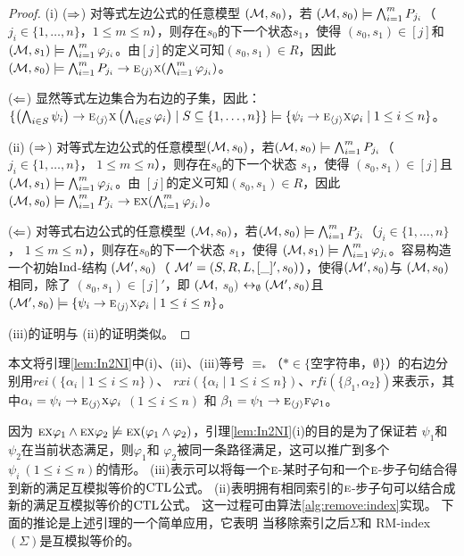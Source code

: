 \begin{proof}
	(i) ($\Rightarrow$) 对等式左边公式的任意模型 $({\cal M},s_0)$，若 $({\cal M},s_0) \models \bigwedge_{i=1}^m P_{j_i}$（ $j_i \in \{1, \dots, n\}$，$1\leq m \leq n$），则存在$s_0$的下一个状态$s_1$，使得 $(s_0, s_1) \in [j]$和 $({\cal M}, s_1) \models \bigwedge_{i=1}^m \varphi_{j_i}$。由$[j]$的定义可知$(s_0, s_1) \in R$，因此$({\cal M}, s_0) \models \bigwedge_{i=1}^m P_{j_i} \rightarrow \textsc{e}_{{\langle{j}\rangle}} \textsc{x} (\bigwedge_{i=1}^m \varphi_{j_i})$。 %
	
	($\Leftarrow$)  显然等式左边集合为右边的子集，因此：
	$\{\left(\bigwedge_{i\in S}\psi_i\right)\rightarrow \textsc{e}_{{\langle{j}\rangle}} \textsc{x} \left(\bigwedge_{i\in S}\varphi_i\right)\mid S\subseteq\{1,\dots, n\}\} \models \{\psi_i\rightarrow \textsc{e}_{{\langle{j}\rangle}} \textsc{x} \varphi_i \mid 1\le i\le n\}$。
	
	(ii) ($\Rightarrow$) 对等式左边公式的任意模型$({\cal M},s_0)$，若$({\cal M},s_0) \models \bigwedge_{i=1}^m P_{j_i}$（$j_i \in \{1, \dots, n\}$， $1\leq m \leq n$），则存在$s_0$的下一个状态 $s_1$，使得 $(s_0, s_1) \in [j]$且$({\cal M}, s_1) \models \bigwedge_{i=1}^m \varphi_{j_i}$。由 $[j]$的定义可知$(s_0, s_1) \in R$，因此$({\cal M}, s_0) \models \bigwedge_{i=1}^m P_{j_i} \rightarrow \textsc{e} \textsc{x} (\bigwedge_{i=1}^m \varphi_{j_i})$。 %
	
	($\Leftarrow$) 对等式右边公式的任意模型 $({\cal M},s_0)$，若$({\cal M},s_0) \models \bigwedge_{i=1}^m P_{j_i}$（$j_i \in \{1, \dots, n\}$， $1\leq m \leq n$），则存在$s_0$的下一个状态 $s_1$，使得 $({\cal M}, s_1) \models \bigwedge_{i=1}^m \varphi_{j_i}$。容易构造一个初始$\textrm{Ind}$-结构 $({\cal M}',s_0)$（ ${\cal M}'=(S,R,L,[\_]',s_0)$），使得$({\cal M}', s_0)$与 $({\cal M}, s_0)$相同，除了 $(s_0, s_1) \in [j]'$，即 $({\cal M},$ $s_0)$ $\leftrightarrow_{\emptyset} ({\cal M}', s_0)$且 $({\cal M}',s_0) \models \{\psi_i\rightarrow \textsc{e}_{{\langle{j}\rangle}} \textsc{x} \varphi_i \mid 1\le i\le n\}$。 
	
	(iii)的证明与 (ii)的证明类似。
\end{proof}


本文将引理\ref{lem:In2NI}中(i)、(ii)、(iii)等号 $\equiv_*$（$* \in \{$空字符串，$\emptyset\}$）的右边分别用$rei(\{\alpha_i\mid 1\le i\le n\})$、
$rxi(\{\alpha_i\mid 1\le i\le n\})$、$rfi(\{\beta_1,\alpha_2\})$来表示，其中$\alpha_i=\psi_i\rightarrow \textsc{e}_{{\langle{j}\rangle}} \textsc{x} \varphi_i$ $(1\le i\le n)$ 和 $\beta_1=\psi_1 \rightarrow \textsc{e}_{{\langle{j}\rangle}}\textsc{f} \varphi_1$。



因为 $\textsc{e}\textsc{x}\varphi_1\land \textsc{e}\textsc{x}\varphi_2\not\models \textsc{e}\textsc{x}(\varphi_1\land\varphi_2)$，引理\ref{lem:In2NI}(i)的目的是为了保证若 $\psi_1$和 $\psi_2$在当前状态满足，则$\varphi_1$和 $\varphi_2$被同一条路径满足，这可以推广到多个 $\psi_i~(1\le i\le n)$的情形。 
(iii)表示可以将每一个$\textsc{e}$-某时子句和一个$\textsc{e}$-步子句结合得到新的满足互模拟等价的$\textrm{CTL}$公式。
(ii)表明拥有相同索引的$\textsc{e}$-步子句可以结合成新的满足互模拟等价的$\textrm{CTL}$公式。
这一过程可由算法\ref{alg:remove:index}实现。
下面的推论是上述引理的一个简单应用，它表明 当移除索引之后$\Sigma$和 RM-index$(\Sigma)$是互模拟等价的。


